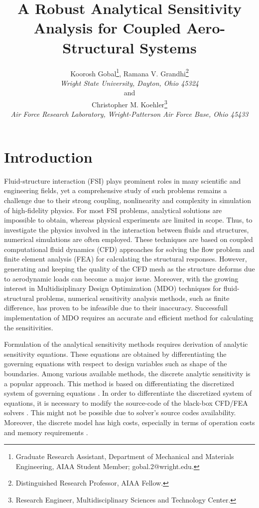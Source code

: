 \documentclass[12pt]{aiaa-pretty}
\author[Gobal, Kohler, and Grandhi]{ %
Koorosh Gobal\thanks{Graduate Research Assistant, Department of Mechanical and Materials Engineering, AIAA Student Member; gobal.2@wright.edu.},
Ramana V. Grandhi\thanks{Distinguished Research Professor, AIAA Fellow.}\\
\textit{Wright State University, Dayton, Ohio 45324}
\\
and 
\\
Christopher M. Koehler\thanks{Research Engineer, Multidisciplinary Sciences and Technology Center.}\\
\textit{Air Force Research Laboratory, Wright-Patterson Air Force Base, Ohio 45433}}
\title{A Robust Analytical Sensitivity Analysis for Coupled Aero-Structural Systems}
\begin{document}
\maketitle
\section{Introduction}
Fluid-structure interaction (FSI) plays prominent roles in many scientific and engineering fields, yet a comprehensive study of such problems remains a challenge due to their strong coupling, nonlinearity and complexity in simulation of high-fidelity physics. For most FSI problems, analytical solutions are impossible to obtain, whereas physical experiments are limited in scope. Thus, to investigate the physics involved in the interaction between fluids and structures, numerical simulations are often employed. These techniques are based on coupled computational fluid dynamics (CFD) approaches for solving the flow problem and finite element analysis (FEA) for calculating the structural responses. However, generating and keeping the quality of the CFD mesh as the structure deforms due to aerodynamic loads can become a major issue. Moreover, with the growing interest in Multidisiplinary Design Optimization (MDO) techniques for fluid-structural problems, numerical sensitivity analysis methods, such as finite difference, has proven to be infeasible due to their inaccuracy. Successfull implementation of MDO requires an accurate and efficient method for calculating the sensitivities.

Formulation of the analytical sensitivity methods requires derivation of analytic sensitivity equations. These equations are obtained by differentiating the governing equations with respect to design variables such as shape of the boundaries. Among various available methods, the discrete analytic sensitivity is a popular approach. This method is based on differentiating the discretized system of governing equations \cite{martins2013review}. In order to differentiate the discretized system of equations, it is necessary to modify the source-code of the black-box CFD/FEA solvers \cite{cross2014local}. This might not be possible due to solver's source codes availability. Moreover, the discrete model has high costs, especially in terms of operation costs and memory requirements \cite{peter2010numerical}.
\end{document}

